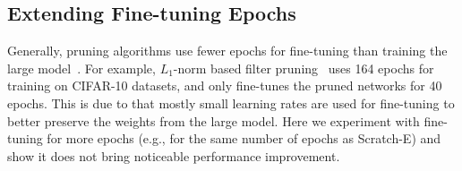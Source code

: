 \renewcommand{\arraystretch}{1.15}
\begin{table}[!htbp]
\small
\centering
{}
\caption{Results for $L_1$-norm based filter pruning~\cite{li2016pruning} when the models are aggressively pruned.
}
\label{significant-2}
\end{table}

\renewcommand{\arraystretch}{1.15}
\begin{table}[!htbp]
\small
\centering
{}
\caption{Results for unstructured  pruning~\cite{han2015learning} when the models are aggressively pruned.
}
\label{significant-3}
\end{table}

\subsection{Extending Fine-tuning Epochs}
Generally, pruning algorithms  use fewer epochs for fine-tuning than training the large model~\cite{li2016pruning,he2017channel,luo2017thinet}. For example, $L_1$-norm based filter pruning~\cite{li2016pruning} uses 164 epochs for training on CIFAR-10 datasets, and only fine-tunes the pruned networks for 40 epochs. This is due to that mostly small learning rates are used for fine-tuning to better preserve the weights from the large model.
Here we experiment with fine-tuning for more epochs (e.g., for the same number of epochs as Scratch-E) and show it does not bring noticeable performance improvement. 

